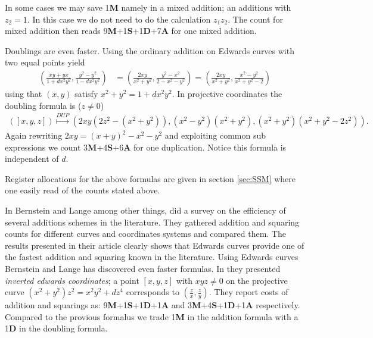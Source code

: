 In some cases we may save 1\textbf{M} namely in a mixed addition; an additions with $z_2=1$. In this case we do not need to do the calculation $z_1z_2$. The count for mixed addition then reads 9\textbf{M}+1\textbf{S}+1\textbf{D}+7\textbf{A} for one mixed addition.

Doublings are even faster. Using the ordinary addition on Edwards curves with two equal points yield
\begin{align*}
\left(\frac{xy+yx}{1+dx^2y^2},\frac{y^2-y^2}{1-dx^2y^2}\right)&=\left(\frac{2xy}{x^2+y^2},\frac{y^2-x^2}{2-x^2-y^2}\right) = \left( \frac{2xy}{x^2+y^2},\frac{x^2-y^2}{x^2+y^2-2}\right)
\end{align*}
using that $(x,y)$ satisfy $x^2+y^2=1+dx^2y^2$. In projective coordinates the doubling formula is ($z\neq 0$)
\begin{align*}
\left([x,y,z]\right)\overset{DUP}\mapsto \left( 2xy(2z^2-(x^2+y^2)),(x^2-y^2)(x^2+y^2),(x^2+y^2)(x^2+y^2-2z^2)\right).
\end{align*}
Again rewriting $2xy=(x+y)^2-x^2-y^2$ and exploiting common sub expressions we count 3\textbf{M}+4\textbf{S}+6\textbf{A} for one duplication. Notice this formula is independent of $d$.

Register allocations for the above formulas are given in section \ref{sec:SSM} where one easily read of the counts stated above. 

In \cite{BL07} Bernstein and Lange among other things, did a survey on the efficiency of several additions schemes in the literature. They gathered addition and squaring counts for different curves and coordinates systems and compared them. The results presented in their article clearly shows that Edwards curves provide one of the fastest addition and squaring known in the literature. Using Edwards curves Bernstein and Lange has discovered even faster formulas. In \cite{inv} they presented \textit{inverted edwards coordinates}; a point $[x,y,z]$ with $xyz\neq 0$  on the projective curve $(x^2+y^2)z^2=x^2y^2+dz^4$ corresponds to $\left(\frac{z}{x},\frac{z}{y}\right)$. They report costs of addition and squarings as: 9\textbf{M}+1\textbf{S}+1\textbf{D}+1\textbf{A} and 3\textbf{M}+4\textbf{S}+1\textbf{D}+1\textbf{A} respectively. Compared to the provious formalus we trade 1\textbf{M} in the addition formula with a 1\textbf{D} in the doubling formula. 

